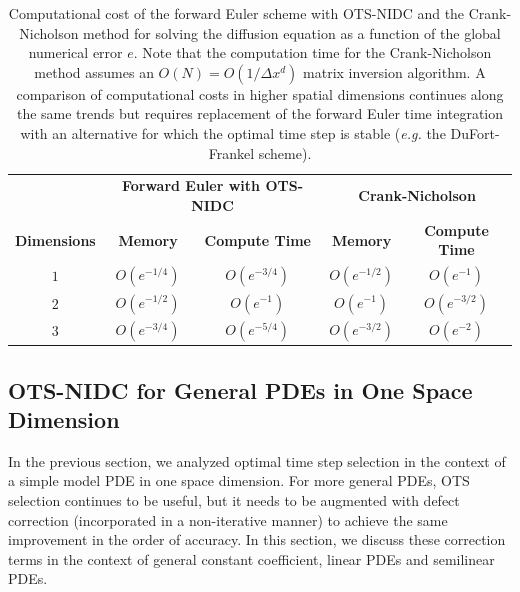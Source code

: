 \documentclass[fleqn,12pt,twoside]{article}
\def\dx{\Delta x}
\def\eg{\emph{e.g. }}
\begin{document}
\begin{table}[tb]
\caption{
Computational cost of the forward Euler scheme with OTS-NIDC and
the Crank-Nicholson method for solving the diffusion equation as a function 
of the global numerical error $e$.
Note that the computation time for the Crank-Nicholson method assumes an 
$O(N) = O \left( 1/\dx^d \right)$ matrix inversion algorithm. 
A comparison of computational costs in higher spatial dimensions continues 
along the same trends but requires replacement of the forward Euler time 
integration with an alternative for which the optimal time step is stable 
(\eg the DuFort-Frankel scheme). 
}
\label{tab:comp_perf_vs_dim}
\renewcommand{\arraystretch}{1.5}
\centering
\begin{tabular}{ccccc}
  \hline
  & \multicolumn{2}{c}{\bf Forward Euler with OTS-NIDC} 
  & \multicolumn{2}{c}{\bf Crank-Nicholson} \\
  \cline{2-3} \cline{4-5} 
    {\bf Dimensions} & {\bf Memory} & {\bf Compute Time} 
  & {\bf Memory} & {\bf Compute Time} \\
  \hline 
  $1$ & $O\left( e^{-1/4} \right)$ 
      & $O\left( e^{-3/4} \right)$ 
      & $O\left( e^{-1/2} \right)$ 
      & $O\left( e^{-1} \right)$ \\ 
  $2$ & $O\left( e^{-1/2} \right)$ 
      & $O\left( e^{-1} \right)$ 
      & $O\left( e^{-1} \right)$ 
      & $O\left( e^{-3/2} \right)$ \\ 
  $3$ & $O\left( e^{-3/4} \right)$ 
      & $O\left( e^{-5/4} \right)$ 
      & $O\left( e^{-3/2} \right)$ 
      & $O\left( e^{-2} \right)$ \\
  \hline 
\end{tabular}
\end{table}



\subsection{\label{sec:ots_nidc_general_1d_pdes} 
            OTS-NIDC for General PDEs in One Space Dimension} 
In the previous section, we analyzed optimal time step selection in the 
context of a simple model PDE in one space dimension.  For more general PDEs, 
OTS selection continues to be useful, but it needs to be augmented with 
defect correction (incorporated in a non-iterative manner) to achieve 
the same improvement in the order of accuracy.  In this section, we discuss 
these correction terms in the context of general constant coefficient, linear 
PDEs and semilinear PDEs. 
\end{document}
